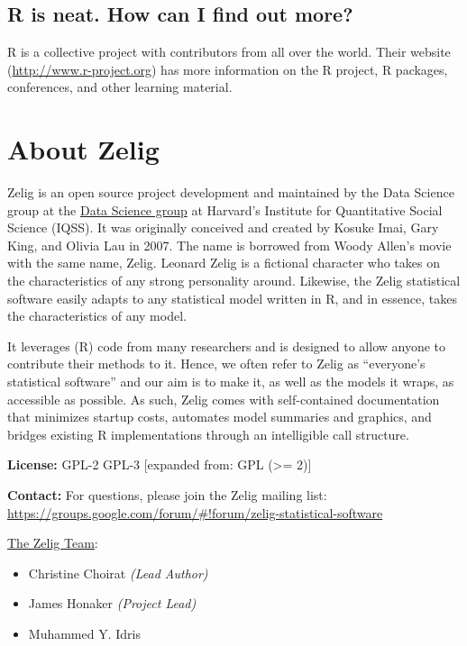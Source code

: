 \documentclass[letterpaper,10pt,english]{sphinxmanual}
\begin{document}
\section{R is neat. How can I find out more?}
\label{faq:r-is-neat-how-can-i-find-out-more}
R is a collective project with contributors from all over the world. Their website (\href{http://www.r-project.org}{http://www.r-project.org}) has more information on the R project, R packages, conferences, and other learning material.


\chapter{About Zelig}
\label{about:about}\label{about::doc}\label{about:about-zelig}
Zelig is an open source project development and maintained by the Data Science group at the \href{http://datascience.iq.harvard.edu/}{Data Science group} at Harvard's Institute for Quantitative Social Science (IQSS). It was originally conceived and created by Kosuke Imai, Gary King, and Olivia Lau in 2007. The name is borrowed from Woody Allen's movie with the same name, Zelig. Leonard Zelig is a fictional character who takes on the characteristics of any strong personality around. Likewise, the Zelig statistical software easily adapts to any statistical model written in R, and in essence, takes the characteristics of any model.

It leverages (R) code from many researchers and is designed to allow anyone to contribute their methods to it. Hence, we often refer to Zelig as ``everyone's statistical software'' and our aim is to make it, as well as the models it wraps, as accessible as possible. As such, Zelig comes with self-contained documentation that minimizes startup costs, automates model summaries and graphics, and bridges existing R implementations through an intelligible call structure.

\textbf{License:} GPL-2 \textbar{} GPL-3 {[}expanded from: GPL (\textgreater{}= 2){]}

\textbf{Contact:} For questions, please join the Zelig mailing list:
\href{https://groups.google.com/forum/\#!forum/zelig-statistical-software}{https://groups.google.com/forum/\#!forum/zelig-statistical-software}

\href{http://datascience.iq.harvard.edu/team}{The Zelig Team}:
\begin{itemize}
\item {} 
Christine Choirat \emph{(Lead Author)}

\item {} 
James Honaker \emph{(Project Lead)}

\item {} 
Muhammed Y. Idris

\end{itemize}
\end{document}
